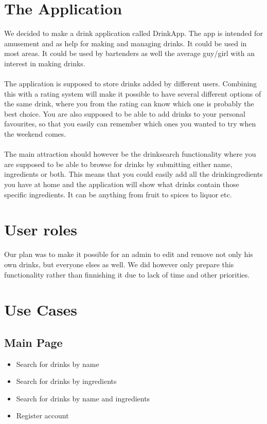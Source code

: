 \documentclass[a4paper]{article}
\begin{document}
\tableofcontents

\pagebreak

\section{The Application}
We decided to make a drink application called DrinkApp. The app is intended for amusement and as help for making and managing drinks. It could be used in most areas. It could be used by bartenders as well the average guy/girl with an interest in making drinks. \\
\\
The application is supposed to store drinks added by different users. Combining this with a rating system will make it possible to have several different options of the same drink, where you from the rating can know which one is probably the best choice. You are also supposed to be able to add drinks to your personal favourites, so that you easily can remember which ones you wanted to try when the weekend comes.\\
\\
The main attraction should however be the drinksearch functionality where you are supposed to be able to browse for drinks by submitting either name, ingredients or both. This means that you could easily add all the drinkingredients you have at home and the application will show what drinks contain those specific ingredients. It can be anything from fruit to spices to liquor etc.

\section{User roles}
Our plan was to make it possible for an admin to edit and remove not only his own drinks, but everyone elses as well. We did however only prepare this functionality rather than finnishing it due to lack of time and other priorities.

\section{Use Cases}

\subsection{Main Page}

\begin{itemize}
\item Search for drinks by name
\item Search for drinks by ingredients
\item Search for drinks by name and ingredients
\item Register account
\end{itemize}
\end{document}

